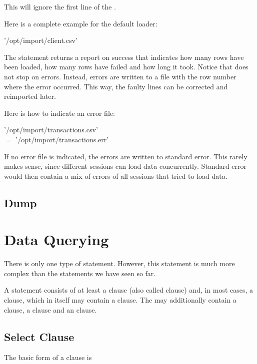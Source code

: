 This will ignore the first line of the .

Here is a complete example for the default loader:

 '/opt/import/client.csv'
  

The  statement returns a report on success
that indicates how many rows have been loaded,
how many rows have failed and how long it took.
Notice that  does not stop on errors.
Instead, errors are written to a file
with the row number where the error occurred.
This way, the faulty lines can be corrected and
reimported later.

Here is how to indicate an error file:

 '/opt/import/transactions.csv'
  \\
\hspace*{0.3cm} $=$ '/opt/import/transactions.err'

If no error file is indicated,
the errors are written to standard error.
This rarely makes sense,
since different sessions can load data concurrently.
Standard error would then contain a mix
of errors of all sessions that tried to load data.

\subsection{Dump}

\section{Data Querying}
There is only one type of  statement.
However, this statement is much more complex
than the statements we have seen so far.

A  statement consists of at least
a  clause (also called  clause)
and, in most cases, a  clause,
which in itself may contain
a  clause.
The  may additionally contain
a  clause,
a  clause and
an  clause.

\subsection{Select Clause}
The basic form of a  clause is

